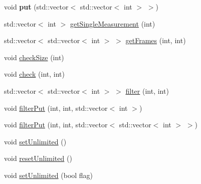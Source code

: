 \begin{DoxyCompactItemize}
\item 
\hypertarget{classRoggenBuffer_a0c49c7ea05d56f174e255dfee8664548}{
void {\bfseries put} (std::vector$<$ std::vector$<$ int $>$ $>$)}
\label{classRoggenBuffer_a0c49c7ea05d56f174e255dfee8664548}

\item 
std::vector$<$ int $>$ \hyperlink{classRoggenBuffer_a08b39243af623747c975c4d92d9a62cd}{getSingleMeasurement} (int)
\item 
std::vector$<$ std::vector$<$ int $>$ $>$ \hyperlink{classRoggenBuffer_a466876e9c5f87bf762467c97ae907048}{getFrames} (int, int)
\item 
void \hyperlink{classRoggenBuffer_a52b15812bb64d1821cbdce1646eab154}{checkSize} (int)
\item 
void \hyperlink{classRoggenBuffer_ad261de53f0e675cc0ed6a704991749c8}{check} (int, int)
\item 
std::vector$<$ std::vector$<$ int $>$ $>$ \hyperlink{classRoggenBuffer_ad1380e701fa8f05486c2f487e6740667}{filter} (int, int)
\item 
void \hyperlink{classRoggenBuffer_a42941bfb6c6319a1317f5da3c670facf}{filterPut} (int, int, std::vector$<$ int $>$)
\item 
void \hyperlink{classRoggenBuffer_a22ac37e59b6943d9f1996a43e58af190}{filterPut} (int, int, std::vector$<$ std::vector$<$ int $>$ $>$)
\item 
void \hyperlink{classRoggenBuffer_a86fe403735010ca3d62dbde7de22c0f3}{setUnlimited} ()
\item 
void \hyperlink{classRoggenBuffer_a252d46936fdf42d67af3f0e28a9c43c2}{resetUnlimited} ()
\item 
void \hyperlink{classRoggenBuffer_a3c0a581a4b554b63ad6ed8a1ee8c4d19}{setUnlimited} (bool flag)
\end{DoxyCompactItemize}
